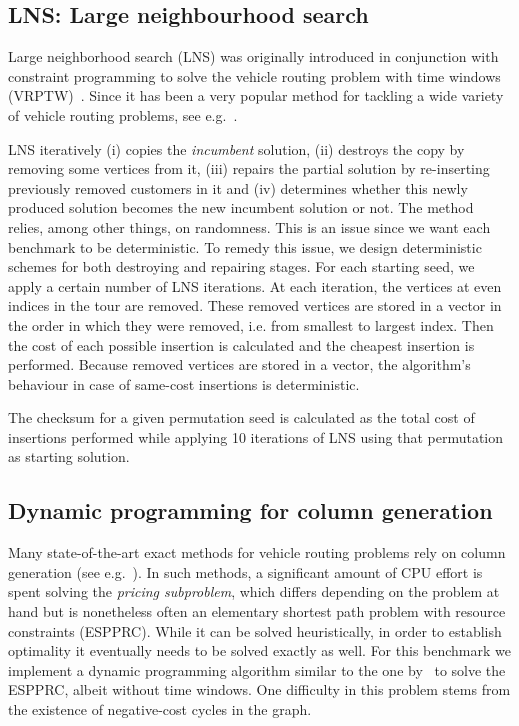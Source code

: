 \documentclass[11pt,a4paper,notitlepage]{article}
\begin{document}
\subsection{LNS: Large neighbourhood search}
Large neighborhood search (LNS) was originally introduced in
conjunction with constraint programming to solve the vehicle routing
problem with time windows (VRPTW)~\cite{lns}. Since it has been
a very popular method for tackling a wide variety of vehicle routing
problems, see e.g.~\cite{lnschapter}.

LNS iteratively (i) copies the \emph{incumbent} solution, (ii)
destroys the copy by removing some vertices from it, (iii) repairs the
partial solution by re-inserting previously removed customers in it
and (iv) determines whether this newly produced solution becomes the
new incumbent solution or not. The method relies, among other
things, on randomness. This is an issue since we want each benchmark
to be deterministic. To remedy this issue, we design deterministic
schemes for both destroying and repairing stages. For each starting
seed, we apply a certain number of LNS iterations. At each iteration,
the vertices at even indices in the tour are removed. These removed
vertices are stored in a vector in the order in which they were
removed, i.e. from smallest to largest index. Then the cost of each
possible insertion is calculated and the cheapest insertion is
performed. Because removed vertices are stored in a vector, the
algorithm's behaviour in case of same-cost insertions is
deterministic. 

The checksum for a given permutation seed is calculated as the total
cost of insertions performed while applying 10 iterations of LNS using
that permutation as starting solution.

\subsection{Dynamic programming for column generation}
Many state-of-the-art exact methods for vehicle routing problems rely
on column generation (see e.g.~\cite{Baldacci:2012survey}). In such
methods, a significant amount of CPU effort is spent solving the
\emph{pricing subproblem}, which differs depending on the problem at
hand but is nonetheless often an elementary shortest path problem with
resource constraints (ESPPRC). While it can be solved heuristically,
in order to establish optimality it eventually needs to be solved
exactly as well. For this benchmark we implement a dynamic
programming algorithm similar to the one by~\cite{feillet:2004exact}
to solve the ESPPRC, albeit without time windows. One difficulty in
this problem stems from the existence of negative-cost cycles in the
graph. 
\end{document}
